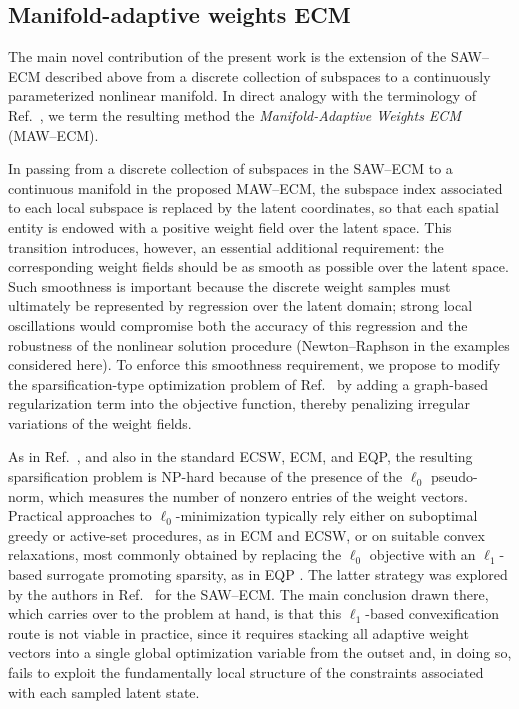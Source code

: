\documentclass[preprint,10pt]{elsarticle}  %
\begin{document}
\subsection{Manifold-adaptive weights ECM}
\label{sec:mawECMintro}


The main novel contribution of the present work is the extension of the
SAW--ECM described above from a discrete collection of subspaces to a
continuously parameterized nonlinear manifold. In direct analogy with
the terminology of Ref.~\cite{bravo2024subspace}, we term the resulting
method the \emph{Manifold-Adaptive Weights ECM} (MAW--ECM).



In passing from a discrete collection of subspaces in the SAW--ECM to a
continuous manifold in the proposed MAW--ECM, the subspace index associated to each local subspace is replaced by the latent
coordinates, so that each spatial entity is endowed with a
positive weight field over the latent space. This transition introduces, however, an essential additional
requirement: the corresponding weight fields should be as smooth as
possible over the latent space.  Such smoothness is important because the discrete weight samples must
ultimately be represented by regression over the latent domain; strong
local oscillations would compromise both the accuracy of this
regression and the robustness of the nonlinear solution procedure
(Newton--Raphson in the examples considered here).   To enforce this smoothness requirement, we propose to modify the sparsification-type optimization problem of
Ref.~\cite{bravo2024subspace} by adding a   graph-based
 regularization term into the objective function, thereby penalizing irregular variations
of the weight fields.

As in Ref.~\cite{bravo2024subspace}, and also in the standard ECSW,
ECM, and EQP, the resulting sparsification problem is NP-hard
\cite{natarajan1995sparse} because of the presence of the \(\ell_0\) pseudo-norm,
which   measures the number of nonzero entries of the weight vectors. Practical approaches to \(\ell_0\)-minimization
typically rely either on suboptimal greedy or active-set procedures,
as in ECM and ECSW, or on suitable convex relaxations, most commonly
obtained by replacing the \(\ell_0\) objective with an
\(\ell_1\)-based surrogate promoting sparsity, as in EQP \cite{yano2019discontinuous,yano2019lp}. The latter
strategy was explored by the authors in
Ref.~\cite{bravo2024subspace} for the SAW--ECM. The main conclusion
drawn there, which carries over to the problem at hand, is that this
\(\ell_1\)-based convexification route is not viable in practice, since
it requires stacking all adaptive weight vectors into a single global
optimization variable from the outset and, in doing so, fails to
exploit the fundamentally local structure of the constraints
associated with each sampled latent state.
\end{document}
